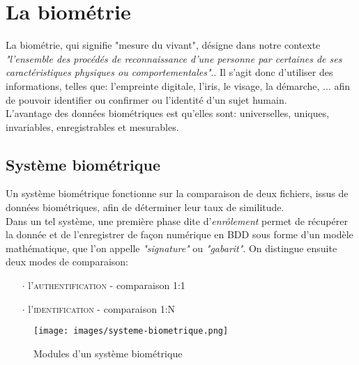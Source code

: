 \section{La biométrie}
La biométrie, qui signifie "mesure du vivant", désigne dans notre contexte \textit{"l'ensemble des procédés de reconnaissance d'une personne par certaines de ses caractéristiques physiques ou comportementales"}.\cite{Xmisc_3}. Il s'agit donc d'utiliser des informations, telles que: l'empreinte digitale, l'iris, le visage, la démarche, ... afin de pouvoir identifier ou confirmer ou l'identité d'un sujet humain.
\\
L'avantage des données biométriques est qu'elles sont: universelles, uniques, invariables, enregistrables et mesurables.

\subsection{Système biométrique}
Un système biométrique fonctionne sur la comparaison de deux fichiers, issus de données biométriques, afin de déterminer leur taux de similitude.
\\
Dans un tel système, une première phase dite d'\textit{enrôlement} permet de récupérer la donnée et de l'enregistrer de façon numérique en BDD sous forme d'un modèle mathématique, que l'on appelle \textit{"signature"} ou \textit{"gabarit"}. On distingue ensuite deux modes de comparaison: 
\begin{itemize}
\item[$\cdot$]l'\textsc{authentification} - comparaison 1:1
\item[$\cdot$]l'\textsc{identification} - comparaison 1:N
\end{itemize}
\begin{figure}[h!]
\texttt{[image: images/systeme-biometrique.png]}
\caption{Modules d'un système biométrique}
\end{figure}

